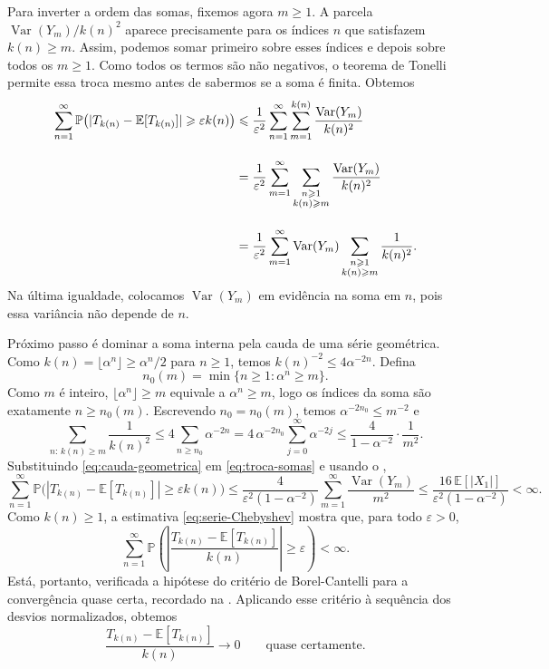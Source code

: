 \documentclass[12pt,portuguese]{article}
\theoremstyle{definition}
\theoremstyle{plainexercise}
\theoremstyle{starredexercise}
\theoremstyle{definition}
\begin{document}
Para inverter a ordem das somas, fixemos agora $m\geqslant1$. A parcela
$\operatorname{Var}(Y_m)/k(n)^2$ aparece precisamente para os índices $n$
que satisfazem $k(n)\geqslant m$. Assim, podemos somar primeiro sobre esses
índices e depois sobre todos os $m\geqslant1$. Como todos os termos são não
negativos, o teorema de Tonelli permite essa troca mesmo antes de sabermos
se a soma é finita. Obtemos
\begin{align}
\sum_{n=1}^{\infty}
\mathbb{P}\bigl(|T_{k(n)}-\mathbb{E}[T_{k(n)}]|\geqslant\varepsilon k(n)\bigr)
&\leqslant
\frac{1}{\varepsilon^2}
\sum_{n=1}^{\infty}\sum_{m=1}^{k(n)}
\frac{\operatorname{Var}(Y_m)}{k(n)^2}
\notag\\[0.4cm]
&=
\frac{1}{\varepsilon^2}
\sum_{m=1}^{\infty}
\sum_{\substack{n\geqslant1\\k(n)\geqslant m}}
\frac{\operatorname{Var}(Y_m)}{k(n)^2}
\notag\\[0.4cm]
&=
\frac{1}{\varepsilon^2}
\sum_{m=1}^{\infty}\operatorname{Var}(Y_m)
\sum_{\substack{n\geqslant1\\k(n)\geqslant m}}\frac{1}{k(n)^2}.
\label{eq:troca-somas}
\end{align}
Na última igualdade, colocamos $\operatorname{Var}(Y_m)$ em evidência na
soma em $n$, pois essa variância não depende de $n$.

Próximo passo é dominar a soma interna pela cauda de uma série geométrica. Como
$k(n)=\lfloor\alpha^n\rfloor\geqslant\alpha^n/2$ para $n\geqslant1$, temos
$k(n)^{-2}\leqslant4\alpha^{-2n}$. Defina
\[
n_0(m)=\min\{n\geqslant1:\alpha^n\geqslant m\}.
\]
Como $m$ é inteiro, $\lfloor\alpha^n\rfloor\geqslant m$ equivale a
$\alpha^n\geqslant m$, logo os índices da soma são exatamente
$n\geqslant n_0(m)$. Escrevendo $n_0=n_0(m)$, temos
$\alpha^{-2n_0}\leqslant m^{-2}$ e
\begin{equation}\label{eq:cauda-geometrica}
\sum_{n:\,k(n)\geqslant m}\frac{1}{k(n)^2}
\leqslant
4\sum_{n\geqslant n_0}\alpha^{-2n}
=
4\,\alpha^{-2n_0}\sum_{j=0}^{\infty}\alpha^{-2j}
\leqslant
\frac{4}{1-\alpha^{-2}}\cdot\frac{1}{m^2}.
\end{equation}
Substituindo \eqref{eq:cauda-geometrica} em \eqref{eq:troca-somas} e usando o
,
\begin{equation}\label{eq:serie-Chebyshev}
\sum_{n=1}^{\infty}
\mathbb{P}\bigl(|T_{k(n)}-\mathbb{E}[T_{k(n)}]|\geqslant\varepsilon k(n)\bigr)
\leqslant
\frac{4}{\varepsilon^2(1-\alpha^{-2})}
\sum_{m=1}^{\infty}\frac{\operatorname{Var}(Y_m)}{m^2}
\leqslant
\frac{16\,\mathbb{E}[|X_1|]}{\varepsilon^2(1-\alpha^{-2})}
<
\infty.
\end{equation}
Como $k(n)\geqslant1$, a estimativa \eqref{eq:serie-Chebyshev} mostra que,
para todo $\varepsilon>0$,
\[
\sum_{n=1}^{\infty}
\mathbb{P}\left(
\left|\frac{T_{k(n)}-\mathbb{E}[T_{k(n)}]}{k(n)}\right|
\geqslant\varepsilon
\right)<\infty.
\]
Está, portanto, verificada a hipótese do critério de Borel-Cantelli para a
convergência quase certa, recordado na . Aplicando
esse critério à sequência dos desvios normalizados, obtemos
\begin{equation}\label{eq:subsequencia}
\frac{T_{k(n)}-\mathbb{E}[T_{k(n)}]}{k(n)}\longrightarrow0
\qquad\text{quase certamente.}
\end{equation}
\end{document}
